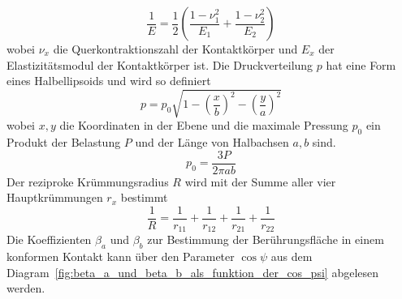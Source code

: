 \begin{equation}
    \label{eq:reduzierter_elastizitaetsmodul}
    \frac{1}{E} = \frac{1}{2}  \left( \frac{1 - \nu_1^2}{E_1} + \frac{1 - \nu_2^2}{E_2} \right)
\end{equation}
%
wobei $\nu_x$ die Querkontraktionszahl der Kontaktkörper und $E_x$ der Elastizitätsmodul der Kontaktkörper ist.
Die Druckverteilung $p$ hat eine Form eines Halbellipsoids und wird so definiert
\begin{equation}
    \label{eq:druckverteilung}
    p = p_0  \sqrt{1 - \left( \frac{x}{b} \right)^2 - \left( \frac{y}{a} \right)^2}
\end{equation}
%
wobei $x, y$ die Koordinaten in der Ebene und die maximale Pressung $p_0$ ein Produkt der Belastung $P$ und der Länge von Halbachsen $a, b$ sind.
\begin{equation}
    \label{eq:maximale_pressung}
    p_0 = \frac{3  P}{2  \pi  a  b}
\end{equation}
%
Der reziproke Krümmungsradius $R$ wird mit der Summe aller vier Hauptkrümmungen $r_x$ bestimmt
\begin{equation}
    \label{eq:kruemmungsradius}
    \frac{1}{R} = \frac{1}{r_{11}} + \frac{1}{r_{12}} + \frac{1}{r_{21}} + \frac{1}{r_{22}}
\end{equation}
%
Die Koeffizienten $\beta_a$ und $\beta_b$ zur Bestimmung der Berührungsfläche in einem konformen Kontakt kann über den Parameter $\cos{\psi}$ aus dem Diagram~\ref{fig:beta_a_und_beta_b_als_funktion_der_cos_psi} abgelesen werden.
